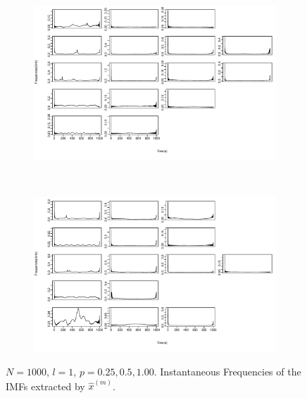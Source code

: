 \documentclass[11pt, a4paper]{article} %
\begin{document}
\begin{figure}
\begin{subfigure}{1.1\textwidth}
  \centering
  \includegraphics[width=\linewidth]{IF_N1000_l1_m1_5.pdf}
  \label{fig:sfig1}
\end{subfigure}\\
\begin{subfigure}{1.1\textwidth}
  \centering
  \includegraphics[width=\linewidth]{IF_N1000_l1_m6_10.pdf}
  \label{fig:sfig2}
\end{subfigure}
\label{fig1}
\caption{$N = 1000$, $l =1$, $p = 0.25, 0.5, 1.00$. Instantaneous Frequencies of the IMFs extracted by $\hat{x}^{(m)}$.}
\end{figure}

\restoregeometry


\end{document}
